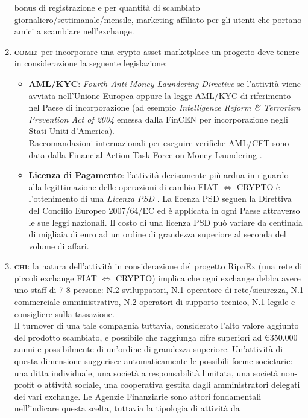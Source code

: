 \documentclass[11pt,fleqn]{book} %
\begin{document}
\begin{enumerate}
	bonus di registrazione e per quantità di scambiato giornaliero/settimanale/mensile, marketing affiliato per gli utenti che portano
	amici a scambiare nell'exchange.
	\item \textbf{\textsc{come}}: per incorporare una crypto asset marketplace un progetto deve tenere in considerazione la seguente legislazione:
		\begin{itemize}
			\item \textbf{AML/KYC}: \textit{Fourth Anti-Money Laundering Directive} se l'attività viene avviata nell'Unione Europea \cite{4AMLD} 
			oppure la legge AML/KYC di riferimento nel Paese di incorporazione (ad esempio \textit{Intelligence Reform \& Terrorism Prevention Act of 2004}
			emessa dalla FinCEN per incorporazione negli Stati Uniti d'America).\\
			Raccomandazioni internazionali per eseguire verifiche AML/CFT sono data dalla Financial Action Task Force on Money Laundering \cite{FATF}.
			\item \textbf{Licenza di Pagamento}: l'attività decisamente più ardua in riguardo alla legittimazione delle operazioni di cambio FIAT $\Leftrightarrow$ CRYPTO
			è l'ottenimento di una \textit{Licenza PSD} \cite{PSD}.
			La licenza PSD seguen la Direttiva del Concilio Europeo 2007/64/EC ed è applicata in ogni Paese attraverso le sue leggi nazionali.
			Il costo di una licenza PSD può variare da centinaia di migliaia di euro ad un ordine di grandezza superiore al seconda del volume di affari.
		\end{itemize}
	\item \textbf{\textsc{chi}}: la natura dell'attività in considerazione del progetto RipaEx 
	(una rete di piccoli exchange FIAT $\Leftrightarrow$ CRYPTO)
	implica che ogni exchange debba avere uno staff di 7-8 persone: N.2 sviluppatori, N.1 operatore di rete/sicurezza, 
	N.1 commerciale amministrativo, N.2 operatori di supporto tecnico, N.1 legale e consigliere sulla tassazione. \\
	Il turnover di una tale compagnia tuttavia, considerato l'alto valore aggiunto del prodotto scambiato, e possibile che raggiunga cifre
	superiori ad \euro 350.000 annui e possibilmente di un'ordine di grandezza superiore. Un'attività di questa dimensione
	suggerisce automaticamente le possibili forme societarie: una ditta individuale, una società a responsabilità limitata,
	una società non-profit o attività sociale, una cooperativa gestita dagli amministratori delegati dei vari exchange.
	Le Agenzie Finanziarie sono attori fondamentali nell'indicare questa scelta, tuttavia la tipologia di attività da

\end{enumerate}
\end{document}
